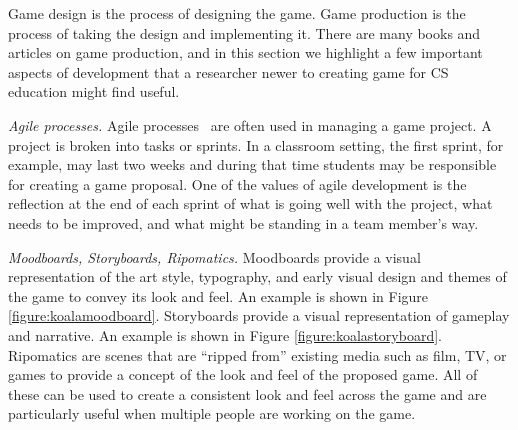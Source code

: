 \documentclass{sig-alternate-05-2015}
\begin{document}
Game design is the process of designing the game. Game production is the process of taking the design and implementing it. There are many books and articles on game production, and in this section we highlight a few important aspects of development that a researcher newer to creating game for CS education might find useful. 



{\em Agile processes. }Agile processes~\cite{agile} are often used in managing a game project. A project is broken into tasks or sprints. In a classroom setting, the first sprint, for example, may last two weeks and during that time students may be responsible for creating a game proposal. One of the values of agile development is the reflection at the end of each sprint of what is going well with the project, what needs to be improved, and what might be standing in a team member's way. 



{\em Moodboards, Storyboards, Ripomatics.} Moodboards provide a visual representation of the art style, typography, and early visual design and themes of the game to convey its look and feel. An example is shown in Figure \ref{figure:koalamoodboard}. Storyboards provide a visual representation of gameplay and narrative. An example is shown in Figure \ref{figure:koalastoryboard}. Ripomatics are scenes that are ``ripped from'' existing media such as film, TV, or games to provide a concept of the look and feel of the proposed game. All of these can be used to create a consistent look and feel across the game and are particularly useful when multiple people are working on the game. 
\end{document}
